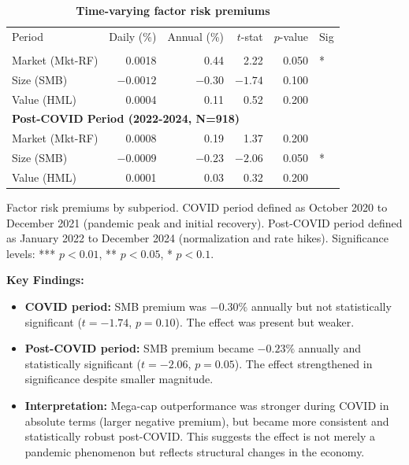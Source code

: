 \documentclass[10pt,letterpaper]{article}
\newlength\savedwidth
\newcommand\thickhline{\noalign{\global\savedwidth\arrayrulewidth\global\arrayrulewidth 2pt}%
\hline
\noalign{\global\arrayrulewidth\savedwidth}}
\begin{document}
\begin{table}[!htbp]
\centering
\caption{\textbf{Time-varying factor risk premiums}}
\begin{tabular}{lrrrrl}
\hline
Period & Daily (\%) & Annual (\%) & $t$-stat & $p$-value & Sig \\
\thickhline
\multicolumn{6}{l}{\textbf{COVID Period (2020-2021, N=300)}} \\
Market (Mkt-RF) & 0.0018 & 0.44 & 2.22 & 0.050 & * \\
Size (SMB) & $-0.0012$ & $-0.30$ & $-1.74$ & 0.100 & \\
Value (HML) & 0.0004 & 0.11 & 0.52 & 0.200 & \\
\hline
\multicolumn{6}{l}{\textbf{Post-COVID Period (2022-2024, N=918)}} \\
Market (Mkt-RF) & 0.0008 & 0.19 & 1.37 & 0.200 & \\
Size (SMB) & $-0.0009$ & $-0.23$ & $-2.06$ & 0.050 & * \\
Value (HML) & 0.0001 & 0.03 & 0.32 & 0.200 & \\
\hline
\end{tabular}
\begin{flushleft}
Factor risk premiums by subperiod. COVID period defined as October 2020 to December 2021 (pandemic peak and initial recovery). Post-COVID period defined as January 2022 to December 2024 (normalization and rate hikes). Significance levels: *** $p<0.01$, ** $p<0.05$, * $p<0.1$.
\end{flushleft}
\label{table:timevarying}
\end{table}

\textbf{Key Findings:}
\begin{itemize}
\item \textbf{COVID period:} SMB premium was $-0.30\%$ annually but not statistically significant ($t=-1.74$, $p=0.10$). The effect was present but weaker.
\item \textbf{Post-COVID period:} SMB premium became $-0.23\%$ annually and statistically significant ($t=-2.06$, $p=0.05$). The effect strengthened in significance despite smaller magnitude.
\item \textbf{Interpretation:} Mega-cap outperformance was stronger during COVID in absolute terms (larger negative premium), but became more consistent and statistically robust post-COVID. This suggests the effect is not merely a pandemic phenomenon but reflects structural changes in the economy.
\end{itemize}
\end{document}
